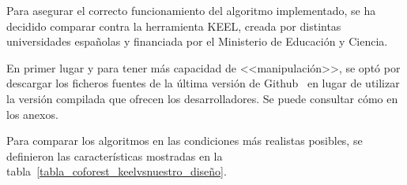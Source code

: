 Para asegurar el correcto funcionamiento del algoritmo implementado, se ha decidido comparar contra la herramienta KEEL, creada por distintas universidades españolas y financiada por el Ministerio de Educación y Ciencia.

En primer lugar y para tener más capacidad de <<manipulación>>, se optó por descargar los ficheros fuentes de la última versión de Github~\cite{keelRepo} en lugar de utilizar la versión compilada que ofrecen los desarrolladores. Se puede consultar cómo en los anexos.

Para comparar los algoritmos en las condiciones más realistas posibles, se definieron las características mostradas en la tabla~\ref{tabla_coforest_keelvsnuestro_diseño}.

\begin{table}
	\caption[\textit{Co-forest}: resumen del experimento]{Tabla resumen con el diseño del experimento.}
	\label{tabla_coforest_keelvsnuestro_diseño}	
\end{table}

